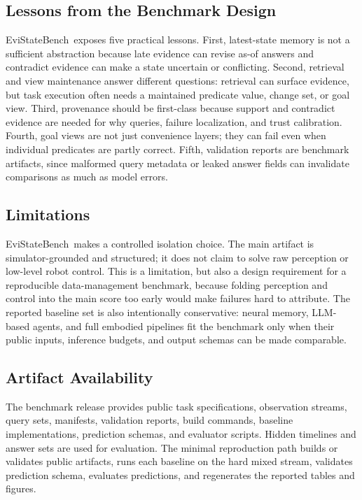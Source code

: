 \documentclass[conference]{IEEEtran}
\newcommand{\bench}{EviStateBench}
\begin{document}
\subsection{Lessons from the Benchmark Design}

\bench\ exposes five practical lessons. First, latest-state memory is not a sufficient abstraction because late evidence can revise as-of answers and contradict evidence can make a state uncertain or conflicting. Second, retrieval and view maintenance answer different questions: retrieval can surface evidence, but task execution often needs a maintained predicate value, change set, or goal view. Third, provenance should be first-class because support and contradict evidence are needed for why queries, failure localization, and trust calibration. Fourth, goal views are not just convenience layers; they can fail even when individual predicates are partly correct. Fifth, validation reports are benchmark artifacts, since malformed query metadata or leaked answer fields can invalidate comparisons as much as model errors.

\subsection{Limitations}

\bench\ makes a controlled isolation choice. The main artifact is simulator-grounded and structured; it does not claim to solve raw perception or low-level robot control. This is a limitation, but also a design requirement for a reproducible data-management benchmark, because folding perception and control into the main score too early would make failures hard to attribute. The reported baseline set is also intentionally conservative: neural memory, LLM-based agents, and full embodied pipelines fit the benchmark only when their public inputs, inference budgets, and output schemas can be made comparable.

\subsection{Artifact Availability}

The benchmark release provides public task specifications, observation streams, query sets, manifests, validation reports, build commands, baseline implementations, prediction schemas, and evaluator scripts. Hidden timelines and answer sets are used for evaluation. The minimal reproduction path builds or validates public artifacts, runs each baseline on the hard mixed stream, validates prediction schema, evaluates predictions, and regenerates the reported tables and figures.
\end{document}
